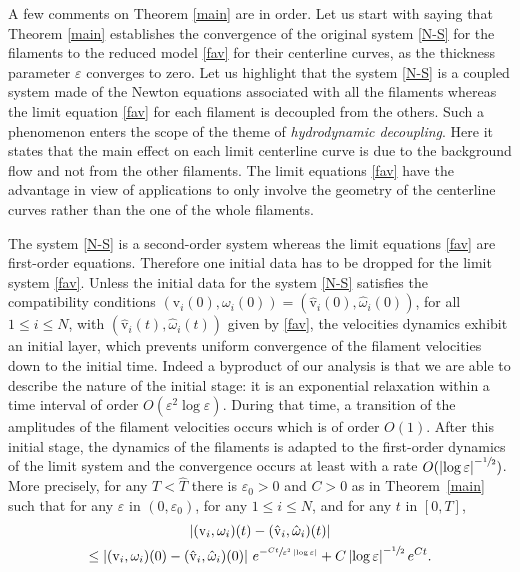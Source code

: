 \documentclass[10pt]{amsart}
\let\eps\varepsilon
\theoremstyle{definition}
\theoremstyle{remark}
\begin{document}
A few comments on Theorem \ref{main} are in order. Let us start with saying that Theorem \ref{main} establishes the convergence of the original system \eqref{N-S} for the filaments to the reduced model \eqref{fav} for their centerline curves, as the thickness parameter $\eps$ converges to zero. Let us highlight that the system \eqref{N-S} is a coupled system made of the Newton equations associated with all the filaments whereas the limit equation \eqref{fav} for each filament is decoupled from the others. Such a phenomenon enters the scope
of the theme of \textit{hydrodynamic decoupling}. Here it states that the main effect on each limit centerline curve is due to the background flow and not from the other filaments. The limit equations \eqref{fav} have the advantage in view of applications to only involve the geometry of the centerline curves rather than the one of the whole filaments.

The system \eqref{N-S} is a second-order system whereas the limit equations \eqref{fav} are {first-order equations}. Therefore one initial data has to be dropped for the limit system \eqref{fav}. Unless
the initial data for the system \eqref{N-S} satisfies the compatibility conditions $(\textrm{v}_i (0),\omega_i (0)) = (\hat{\textrm{v}}_i(0),{\hat \omega}_i (0))$, for all $1 \leq i \leq N$, with $(\hat{\textrm{v}}_i(t),{\hat \omega}_i (t))$ given by \eqref{fav},
the velocities dynamics exhibit {an} initial layer, which prevents
uniform convergence of the filament velocities down to the initial time.
Indeed a byproduct of our analysis is that
we are able to describe the nature of the initial stage: it is an exponential relaxation within a time interval of order
$O(\eps^2 \log \eps)${. During that} time,
a transition of the amplitudes of the filament velocities occurs which is of order $O(1)$. After this initial stage, the dynamics of the filaments is adapted to the first-order dynamics of the limit system and the convergence occurs at least with a rate $O(\left|\log \eps \right|^{-\sfrac12})$.
More precisely, {for any $T < \hat T$ there is $\eps_0 > 0$ and $C>0$ as in Theorem~\ref{main}} such that for any $\eps $ in $(0,\eps_0)$, for any $1 \leq i \leq N$, and for any $t$ in $[0,T]$,%
\begin{multline}
\left| ({\textrm{v}}_i,\omega_{i})(t) - ({\hat {\textrm{v}}}_i, \hat \omega_i) (t) \right|\\
\leq \left| (\textrm{v}_i,\omega_i) (0)-
(\hat{\textrm{v}}_i,{\hat \omega}_i) (0) \right| \, e^{- \sfrac{C t}{\eps^2 \left|\log \eps\right|}} + C \left|\log \eps\right|^{-\sfrac12} e^{Ct}. \label{allezesti}
\end{multline}
\end{document}
